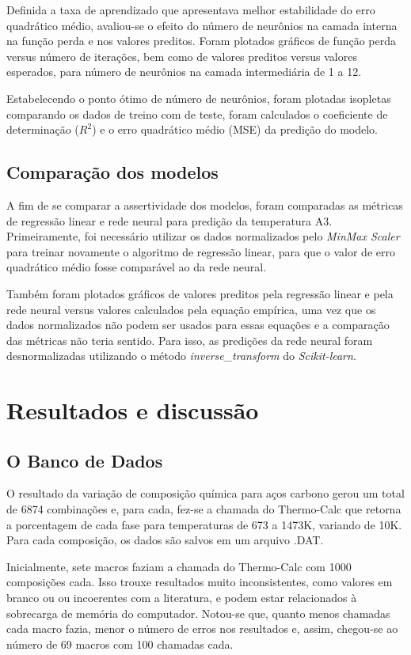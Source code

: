 \documentclass[brazil,tf,epusp]{usp}  %
\begin{document}
Definida a taxa de aprendizado que apresentava melhor estabilidade do erro quadrático médio, avaliou-se o efeito do número de neurônios na camada interna na função perda e nos valores preditos. Foram plotados gráficos de função perda versus número de iterações, bem como de valores preditos versus valores esperados, para número de neurônios na camada intermediária de 1 a 12.

Estabelecendo o ponto ótimo de número de neurônios, foram plotadas isopletas comparando os dados de treino com de teste, foram calculados o coeficiente de determinação ($R^{2}$) e o erro quadrático médio (MSE) da predição do modelo.

\section{Comparação dos modelos}

A fim de se comparar a assertividade dos modelos, foram comparadas as métricas de regressão linear e rede neural para predição da temperatura A3. Primeiramente, foi necessário utilizar os dados normalizados pelo \textit{MinMax Scaler} para treinar novamente o algoritmo de regressão linear, para que o valor de erro quadrático médio fosse comparável ao da rede neural.

Também foram plotados gráficos de valores preditos pela regressão linear e pela rede neural versus valores calculados pela equação empírica, uma vez que os dados normalizados não podem ser usados para essas equações e a comparação das métricas não teria sentido. Para isso, as predições da rede neural foram desnormalizadas utilizando o método \textit{inverse\_transform} do \textit{Scikit-learn}.


\chapter{Resultados e discussão}
\section{O Banco de Dados}
O resultado da variação de composição química para aços carbono gerou um total de 6874 combinações e, para cada, fez-se a chamada do Thermo-Calc\textregistered{} que retorna a porcentagem de cada fase para temperaturas de 673 a 1473K, variando de 10K. Para cada composição, os dados são salvos em um arquivo .DAT.

Inicialmente, sete macros faziam a chamada do Thermo-Calc\textregistered{} com 1000 composições cada. Isso trouxe resultados muito inconsistentes, como valores em branco ou ou incoerentes com a literatura, e podem estar relacionados à sobrecarga de memória do computador. Notou-se que, quanto menos chamadas cada macro fazia, menor o número de erros nos resultados e, assim, chegou-se ao número de 69 macros com 100 chamadas cada.
\end{document}
